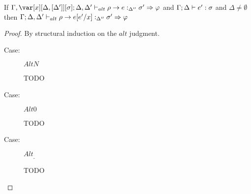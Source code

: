 \begin{sublemma}
If $\G,\xD; \D,\D' \vdash_{alt} \rho \to e :_{\Delta''} \s' \Rightarrow \vp$ and
   $\Gamma; \Delta \vdash e' : \sigma$ and $\Delta \neq \emptyset$ then $\Gamma; \Delta, \Delta' \vdash_{alt} \rho \to e[e'/x] :_{\Delta''} \sigma' \Rightarrow \varphi$
\end{sublemma}

\begin{proof}
By structural induction on the $alt$ judgment.

\begin{description}
\item[Case:] $AltN$
\begin{tabbing}
    TODO
\end{tabbing}

\item[Case:] $Alt0$
\begin{tabbing}
    TODO
\end{tabbing}

\item[Case:] $Alt_\_$
\begin{tabbing}
    TODO
\end{tabbing}
\end{description}

\end{proof}

